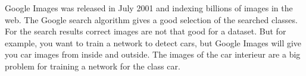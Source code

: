 \documentclass[../ImageClassifier.tex]{subfiles}
\begin{document}
    Google Images \parencite{google-images} was released in July 2001 and indexing billions of images \parencite{google-images-value} in the web.
    The Google search algorithm gives a good selection of the searched classes.
    For the search results correct images are not that good for a dataset.
    But for example, you want to train a network to detect cars, but Google Images will give you car images from inside and outside.
    The images of the car interieur are a big problem for training a network for the class car.
\end{document}
